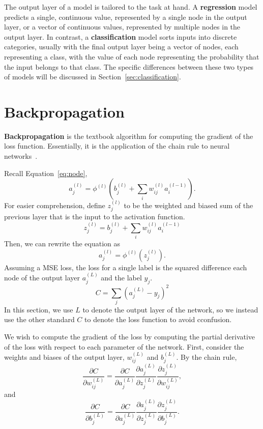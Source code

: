 \documentclass[12pt]{report}
\theoremstyle{definition}
\theoremstyle{remark}
\begin{document}
The output layer of a model is tailored to the task at hand. A \textbf{regression} model predicts a single, continuous value, represented by a single node in the output layer, or a vector of continuous values, represented by multiple nodes in the output layer. In contrast, a \textbf{classification} model sorts inputs into discrete categories, usually with the final output layer being a vector of nodes, each representing a class, with the value of each node representing the probability that the input belongs to that class. The specific differences between these two types of models will be discussed in Section~\ref{sec:classification}.

\section{Backpropagation}

\textbf{Backpropagation} is the textbook algorithm for computing the gradient of the loss function. Essentially, it is the application of the chain rule to neural networks~\cite{nielsen_neural_2019,sanderson_backpropagation_2017}.

Recall Equation~\ref{eq:node},
\begin{equation}
    a^{(l)}_j = \phi^{(l)}\left(b_j^{(l)} + \sum_i w_{ij}^{(l)} a_i^{(l-1)}\right).
\end{equation}
For easier comprehension, define $z^{(l)}_j$ to be the weighted and biased sum of the previous layer that is the input to the activation function.
\begin{equation}\label{eq:weighted-sum}
    z^{(l)}_j = b_j^{(l)} + \sum_i w_{ij}^{(l)} a_i^{(l-1)}
\end{equation}
Then, we can rewrite the equation as
\begin{equation}\label{eq:simplified-node}
    a^{(l)}_j = \phi^{(l)}(z_j^{(l)}).
\end{equation}
Assuming a MSE loss, the loss for a single label is the squared difference each node of the output layer $a^{(L)}_j$ and the label $y_j$.
\begin{equation}
    C = \sum_j {(a^{(L)}_j - y_j)}^2
\end{equation}
In this section, we use $L$ to denote the output layer of the network, so we instead use the other standard $C$ to denote the loss function to avoid cconfusion.

We wish to compute the gradient of the loss by computing the partial derivative of the loss with respect to each parameter of the network. First, consider the weights and biases of the output layer, $w_{ij}^{(L)}$ and $b_j^{(L)}$. By the chain rule,
\begin{equation}\label{eq:chain-rule-weights}
    \frac{\partial C}{\partial w_{ij}^{(L)}} = \frac{\partial C}{\partial a_j^{(L)}} \frac{\partial a_j^{(L)}}{\partial z_j^{(L)}} \frac{\partial z_j^{(L)}}{\partial w_{ij}^{(L)}},
\end{equation}
and
\begin{equation}\label{eq:chain-rule-biases}
    \frac{\partial C}{\partial b_j^{(L)}} = \frac{\partial C}{\partial a_j^{(L)}} \frac{\partial a_j^{(L)}}{\partial z_j^{(L)}} \frac{\partial z_j^{(L)}}{\partial b_j^{(L)}}.
\end{equation}
\end{document}
